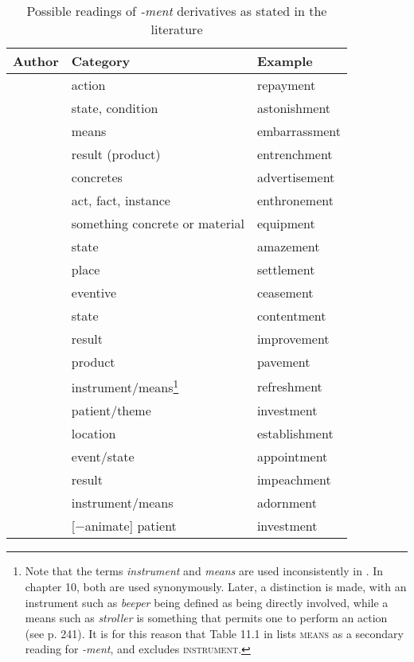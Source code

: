\begin{table} 
  \caption{\label{tab:mentsemlit}Possible readings of \textit{-ment} derivatives as stated in the literature}
      \begin{tabular}{lll}
        \lsptoprule
        Author        & Category      & Example \\ 
        \midrule
\citet{Gadde.1910}  & action      & {repayment} \\
        & state, condition  & {astonishment} \\
         & means       & {embarrassment} \\
        & result (product)  & {entrenchment}\\
        & concretes     & {advertisement} \\ 
        \citet{Marchand.1969}   & act, fact, instance         & {enthronement} \\
        & something concrete or material    & {equipment} \\
        & state               & {amazement} \\
        & place               & {settlement} \\
        \citet{Bauer.2013}  & eventive  &{ceasement} \\
        & state   & {contentment} \\
        & result  & {improvement} \\
        & product & {pavement} \\
        & instrument/means\footnote{Note that the terms \textit{instrument} and \textit{means} are used inconsistently in \citet{Bauer.2013}. In chapter 10, both are used synonymously. Later, a distinction is made, with an instrument such as \textit{beeper} being defined as being directly involved, while a means such as \textit{stroller} is something that permits one to perform an action (see p. 241). It is for this reason that Table 11.1 in \citet[231]{Bauer.2013} lists \textsc{means} as a secondary reading for \textit{-ment}, and excludes \textsc{instrument}.} & {refreshment} \\
        & patient/theme & {investment} \\
        & location & {establishment} \\
        \citet{Lieber.2016} & event/state &{appointment} \\
        & result  & {impeachment} \\
        & instrument/means & {adornment} \\
        & [−animate] patient & {investment} \\

\end{tabular}
\end{table}
